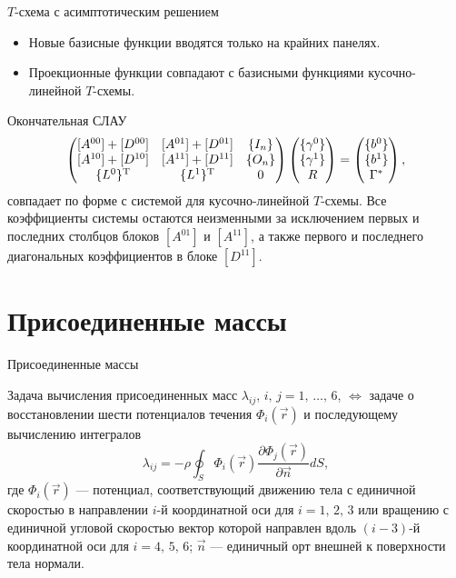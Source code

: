 \documentclass[ignoreonframetext,unicode]{beamer}
\begin{document}
\begin{frame}{$T$-схема с асимптотическим решением}
	\begin{block}{}
		\begin{itemize}
			\item Новые базисные функции вводятся только на крайних панелях.
			\item Проекционные функции совпадают с базисными функциями кусочно-линейной $T$-схемы.
		\end{itemize}
	\end{block}
Окончательная СЛАУ
	\begin{equation*}
	\begin{pmatrix}
		[A^{00}] + [D^{00}] & [A^{01}] + [D^{01}] & \{I_n\} \\
		[A^{10}] + [D^{10}] & [A^{11}] + [D^{11}] & \{O_n\}\\
		\{L^0\}^{\mathrm{T}} & \{L^1\}^{\mathrm{T}} & 0
	\end{pmatrix}
	\label{sys2}
	\left(
	\begin{array}{@{}c@{}}
	\{\gamma^0\}\\
	\{\gamma^1\}\\
	R
	\end{array}
	\right)
	=
	\left(
	\begin{array}{@{}c@{}}
	\{b^0\} \\
	\{b^1\}\\
	\Gamma^\ast
	\end{array}
	\right),
	\end{equation*}
совпадает по форме с системой для кусочно-линейной $T$-схемы. Все коэффициенты системы остаются неизменными за исключением первых и последних столбцов блоков $[A^{01}]$ и $[A^{11}]$, а также первого и последнего диагональных коэффициентов в блоке $[D^{11}]$.	
\end{frame}

\section{Присоединенные массы}
\begin{frame}{Присоединенные массы}
\begin{block}{}
	 Задача вычисления присоединенных масс $\lambda_{ij}$, $i,\,j=1,\,\ldots,\,6$, $\Leftrightarrow$ задаче о восстановлении шести потенциалов течения $\Phi_i(\vec r)$ и последующему вычислению интегралов
	\[
	\lambda_{ij} = -\rho \oint_S \Phi_i(\vec r) \frac{\partial \Phi_j(\vec r)}{\partial \vec n} dS,
	\]
	где $\Phi_i(\vec r)$ --- потенциал, соответствующий движению тела с единичной скоростью в направлении $i$-й координатной оси для $i=1,\,2,\,3$ или вращению с единичной угловой скоростью вектор которой направлен вдоль $(i-3)$-й координатной оси для $i=4,\,5,\,6$; $\vec n$ --- единичный орт внешней к поверхности тела нормали.
\end{block}	
\end{frame}	
\end{document}
